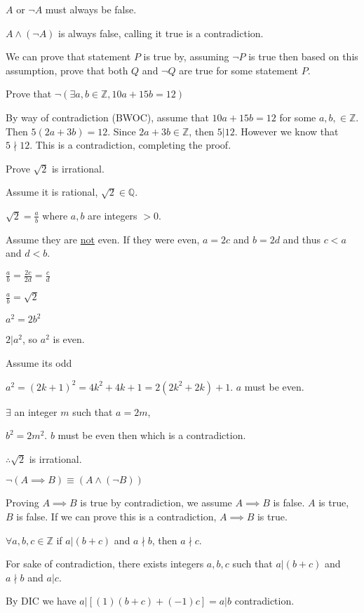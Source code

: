\documentclass{article}
\begin{document}
$A$ or $\neg A$ must always be false.

$A \wedge (\neg A)$ is always false, calling it true is a contradiction. 

We can prove that statement $P$ is true by, assuming $\neg P$ is true then based on this assumption, prove that both $Q$ and $\neg Q$ are true for some statement $P$. 

Prove that $\neg(\exists a, b \in \mathbb{Z}, 10a + 15b = 12)$

By way of contradiction (BWOC), assume that $10a + 15b = 12$ for some $a,b, \in \mathbb{Z}$. Then $5(2a + 3b) = 12.$ Since $2a + 3b \in \mathbb{Z}$, then $5 \vert 12$. However we know that $5 \nmid 12$. This is a contradiction, completing the proof.

Prove $\sqrt{2}$ is irrational. 

Assume it is rational, $\sqrt{2} \in \mathbb{Q}$.

$\sqrt{2} = \frac{a}{b}$ where $a,b$ are integers $> 0$.

Assume they are \underline{not} even. If they were even, $a = 2c$ and $b = 2d$ and thus $c < a$ and $d < b$.

$\frac{a}{b} = \frac{2c}{2d} = \frac{c}{d}$

$\frac{a}{b} = \sqrt{2}$

$a^2 = 2b^2$

$2 \vert a^2$, so $a^2$ is even.


Assume its odd

$a^2 = (2k+1)^2 = 4k^2 + 4k+1 = 2(2k^2+2k)+1$. $a$ must be even.

$\exists$ an integer $m$ such that $a = 2m$, 

$b^2 = 2m^2$. $b$ must be even then which is a contradiction. 

$\therefore \sqrt{2}$ is irrational.

$\neg(A \implies B) \equiv (A \wedge (\neg B))$

Proving $A \implies B$ is true by contradiction, we assume $A \implies B$ is false. $A$ is true, $B$ is false. If we can prove this is a contradiction, $A \implies B$ is true.


$\forall a,b,c \in \mathbb{Z}$ if $a \vert (b + c)$ and $a \nmid b$, then $a \nmid c$. 

For sake of contradiction, there exists integers $a,b,c$ such that $a \vert (b + c)$ and $a \nmid b$ and $a \vert c$. 

By DIC we have $a \vert [(1)(b+c) + (-1)c] = a \vert b$ contradiction. 
\end{document}
